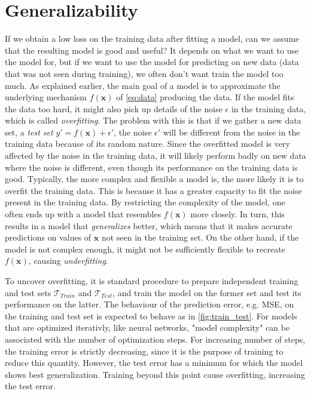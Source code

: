 \section{Generalizability}\label{sec:Generalizability}
If we obtain a low loss on the training data after fitting a model, can we assume that the resulting model is good and useful? It depends on what we want to use the model for, but if we want to use the model for predicting on new data (data that was not seen during training), we often don't want train the model too much. As explained earlier, the main goal of a model is to approximate the underlying mechanism $f(\boldsymbol{x})$ of \autoref{eq:data} producing the data. If the model fits the data too hard, it might also pick up details of the noise $\epsilon$ in the training data, which is called \emph{overfitting}. The problem with this is that if we gather a new data set, a \emph{test set} $y' = f(\boldsymbol{x}) + \epsilon'$, the noise $\epsilon'$ will be different from the noise in the training data because of its random nature. Since the overfitted model is very affected by the noise in the training data, it will likely perform badly on new data where the noise is different, even though its performance on the training data is good. Typically, the more complex and flexible a model is, the more likely it is to overfit the training data. This is because it has a greater capacity to fit the noise present in the training data. By restricting the complexity of the model, one often ends up with a model that resembles $f(\boldsymbol{x})$ more closely. In turn, this results in a model
that \emph{generalizes} better, which means that it makes accurate predictions on values of $\boldsymbol{x}$ not seen in the training set. On the other hand, if the model is not complex enough, it might not be sufficiently flexible to recreate $f(\boldsymbol{x})$, causing \emph{underfitting}.

To uncover overfitting, it is standard procedure to prepare independent training and test sets $\mathcal{T}_{Train}$ and $\mathcal{T}_{Test}$, and train the model on the former set and test its performance on the latter. The behaviour of the prediction error, e.g. MSE, on the training and test set is expected to behave as in \autoref{fig:train_test}. For models that are optimized iterativly, like neural networks, "model complexity" can be associated with the number of optimization steps. For increasing number of steps, the training error is strictly decreasing, since it is the purpose of training to reduce this quantity. However, the test error has a minimum for which the model shows best generalization. Training beyond this point cause overfitting, increasing the test error. 

